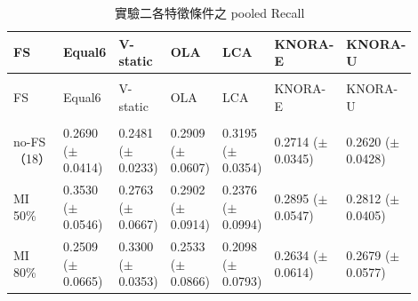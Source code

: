 \begingroup
\small{}\setlength{\tabcolsep}{3pt}
\setlength{\LTleft}{\fill}\setlength{\LTright}{\fill}
\begin{longtable}{@{}>{\raggedright\arraybackslash}p{0.16\linewidth}>{\raggedright\arraybackslash}p{0.123\linewidth}>{\raggedright\arraybackslash}p{0.123\linewidth}>{\raggedright\arraybackslash}p{0.123\linewidth}>{\raggedright\arraybackslash}p{0.123\linewidth}>{\raggedright\arraybackslash}p{0.123\linewidth}>{\raggedright\arraybackslash}p{0.123\linewidth}@{}}
\caption{實驗二各特徵條件之 pooled Recall}\label{tab:results-fs-recall}\\
\toprule
FS & Equal6 & V-static & OLA & LCA & KNORA-E & KNORA-U \\
\midrule\endfirsthead
\multicolumn{7}{c}{表~\thetable（續）}\\
\toprule
FS & Equal6 & V-static & OLA & LCA & KNORA-E & KNORA-U \\
\midrule\endhead
\midrule\multicolumn{7}{r}{續下頁}\\\endfoot
\bottomrule\endlastfoot
no-FS（18） & \shortstack[l]{0.2690\\{\scriptsize(\(\pm\)0.0414)}} & \shortstack[l]{0.2481\\{\scriptsize(\(\pm\)0.0233)}} & \shortstack[l]{0.2909\\{\scriptsize(\(\pm\)0.0607)}} & \shortstack[l]{0.3195\\{\scriptsize(\(\pm\)0.0354)}} & \shortstack[l]{0.2714\\{\scriptsize(\(\pm\)0.0345)}} & \shortstack[l]{0.2620\\{\scriptsize(\(\pm\)0.0428)}} \\
MI 50\% & \shortstack[l]{0.3530\\{\scriptsize(\(\pm\)0.0546)}} & \shortstack[l]{0.2763\\{\scriptsize(\(\pm\)0.0667)}} & \shortstack[l]{0.2902\\{\scriptsize(\(\pm\)0.0914)}} & \shortstack[l]{0.2376\\{\scriptsize(\(\pm\)0.0994)}} & \shortstack[l]{0.2895\\{\scriptsize(\(\pm\)0.0547)}} & \shortstack[l]{0.2812\\{\scriptsize(\(\pm\)0.0405)}} \\
MI 80\% & \shortstack[l]{0.2509\\{\scriptsize(\(\pm\)0.0665)}} & \shortstack[l]{0.3300\\{\scriptsize(\(\pm\)0.0353)}} & \shortstack[l]{0.2533\\{\scriptsize(\(\pm\)0.0866)}} & \shortstack[l]{0.2098\\{\scriptsize(\(\pm\)0.0793)}} & \shortstack[l]{0.2634\\{\scriptsize(\(\pm\)0.0614)}} & \shortstack[l]{0.2679\\{\scriptsize(\(\pm\)0.0577)}} \\

\end{longtable}
